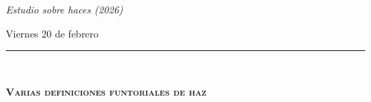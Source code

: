 \normalsize{
    \noindent\textit{Estudio sobre haces (2026)}

    \vspace{-0.1cm}
    \noindent Viernes 20 de febrero
    
    \vspace{-0.2cm}
}
\noindent\rule{10cm}{0.1pt}\\
\vspace{0.5cm}
\begin{center}
   \textsc{
      \Large{\textbf{Varias definiciones funtoriales de haz}}
   }\\ \vspace{0.7cm}
\end{center}
\hspace{3.5cm} \hrulefill \hspace{3.5cm}
